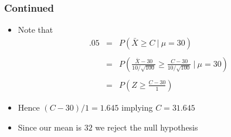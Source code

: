 \documentclass{beamer}
\begin{document}
\begin{frame}\frametitle{Continued}
\begin{itemize}
\item Note that 
  \begin{eqnarray*}
    .05 & = & P\left(\bar X \geq C ~|~ \mu = 30 \right) \\ \\
        & = & P\left(\frac{\bar X - 30}{10 / \sqrt{100}} \geq \frac{C - 30}{10/\sqrt{100}} ~|~ \mu = 30\right) \\ \\
        & = & P\left(Z \geq \frac{C - 30}{1}\right)
  \end{eqnarray*}
\item Hence $(C - 30) / 1 = 1.645$ implying $C = 31.645$
\item Since our mean is $32$ we reject the null hypothesis
\end{itemize}
\end{frame}
\end{document}
